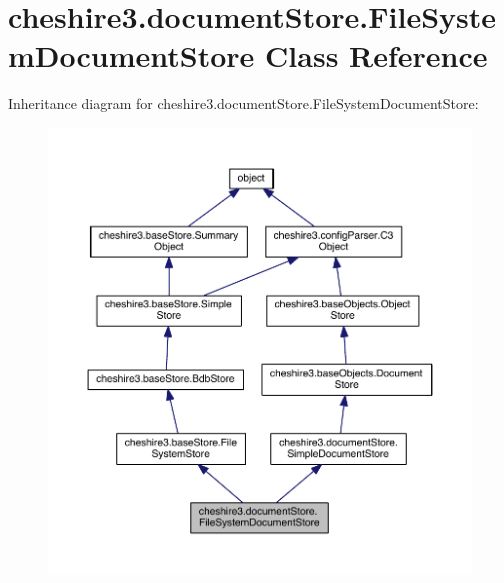 \hypertarget{classcheshire3_1_1document_store_1_1_file_system_document_store}{\section{cheshire3.\-document\-Store.\-File\-System\-Document\-Store Class Reference}
\label{classcheshire3_1_1document_store_1_1_file_system_document_store}
}


Inheritance diagram for cheshire3.\-document\-Store.\-File\-System\-Document\-Store\-:
\nopagebreak
\begin{figure}[H]
\begin{center}
\leavevmode
\includegraphics[width=350pt]{classcheshire3_1_1document_store_1_1_file_system_document_store__inherit__graph}
\end{center}
\end{figure}



